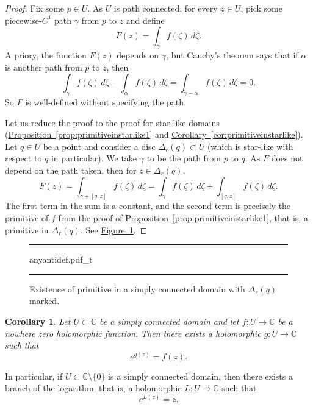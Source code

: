 \documentclass[12pt,openany]{book}
\newcommand{\C}{{\mathbb{C}}}
\theoremstyle{plain}
\newtheorem{cor}[thm]{Corollary}
\theoremstyle{remark}
\theoremstyle{definition}
\newenvironment{myfig}{%
\begin{figure}[h!t]
\noindent\rule{\textwidth}{0.5pt}\vspace{12pt}\par\centering}%
{\par\noindent\rule{\textwidth}{0.5pt}
\end{figure}}
\theoremstyle{exercise}
\theoremstyle{example}
\newcommand{\figureref}[1]{\hyperref[#1]{Figure~\ref*{#1}}}
\newcommand{\propref}[1]{\hyperref[#1]{Proposition~\ref*{#1}}}
\newcommand{\corref}[1]{\hyperref[#1]{Corollary~\ref*{#1}}}
\begin{document}
\begin{proof}
Fix some $p \in U$. As $U$ is path connected, for every $z \in U$, pick
some piecewise-$C^1$ path $\gamma$ from $p$ to $z$
and define
\begin{equation*}
F(z) = \int_\gamma f(\zeta) \, d\zeta .
\end{equation*}
A priory, the function $F(z)$ depends on $\gamma$, but Cauchy's
theorem says that if $\alpha$ is another path from $p$ to $z$, then
\begin{equation*}
\int_\gamma f(\zeta) \, d\zeta -
\int_\alpha f(\zeta) \, d\zeta 
=
\int_{\gamma-\alpha} f(\zeta) \, d\zeta  =  0 .
\end{equation*}
So $F$ is well-defined without specifying the path.

Let us reduce the proof to the proof for 
star-like domains (\propref{prop:primitiveinstarlike1} and
\corref{cor:primitiveinstarlike}).
Let $q \in U$ be a point and consider a disc $\Delta_r(q) \subset U$
(which is star-like with respect to $q$ in particular).
We take $\gamma$ to be the path from $p$ to $q$.
As $F$ does not depend on the path taken, then for $z \in \Delta_r(q)$,
\begin{equation*}
F(z) =
\int_{\gamma+[q,z]} f(\zeta) \, d\zeta
=
\int_{\gamma} f(\zeta) \, d\zeta
+
\int_{[q,z]} f(\zeta) \, d\zeta .
\end{equation*}
The first term in the sum is a constant, and the second term is precisely
the primitive of $f$ from the proof of
\propref{prop:primitiveinstarlike1},
that is, a primitive in
$\Delta_r(q)$.
See \figureref{fig:anyantidef}.
\end{proof}

\begin{myfig}
{anyantidef.pdf_t}
\caption{Existence of primitive in a simply connected
domain with $\Delta_r(q)$ marked.\label{fig:anyantidef}}
\end{myfig}

\begin{cor} \label{cor:simplyconimpleslog}
Let $U \subset \C$ be a simply connected domain and
let $f \colon U \to \C$ be a nowhere zero holomorphic
function.  Then there exists a holomorphic $g \colon U \to \C$
such that
\begin{equation*}
e^{g(z)} = f(z) .
\end{equation*}
\end{cor}

In particular,
if $U \subset \C \setminus \{ 0 \}$ is a simply connected domain, then
there exists a branch of the logarithm, that is,
a holomorphic $L \colon U \to \C$ such that
\begin{equation*}
e^{L(z)} = z .
\end{equation*}
\end{document}
